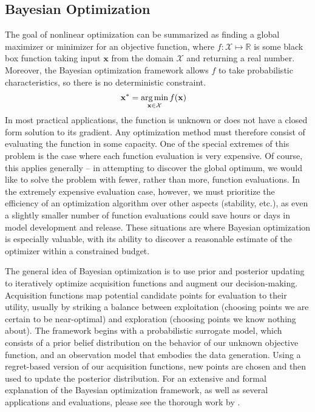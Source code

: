 \documentclass[master]{subfiles}
\begin{document}
\subsection{Bayesian Optimization} \label{sec:bo}
The goal of nonlinear optimization can be summarized as finding a global maximizer or minimizer for an objective function, where $f : \mathcal{X} \mapsto \mathbb{R}$ is some black box function taking input $\mathbf{x}$ from the domain $\mathcal{X}$ and returning a real number.  Moreover, the Bayesian optimization framework allows $f$ to take probabilistic characteristics, so there is no deterministic constraint. 
\begin{align*}
\mathbf{x}^* &= \mathop{\text{\rm arg\,min}}_{\mathbf{x} \in \mathcal{X}}f(\mathbf{x})
\end{align*}
In most practical applications, the function is unknown or does not have a closed form solution to its gradient.  Any optimization method must therefore consist of evaluating the function in some capacity.  One of the special extremes of this problem is the case where each function evaluation is very expensive.  Of course, this applies generally -- in attempting to discover the global optimum, we would like to solve the problem with fewer, rather than more, function evaluations.  In the extremely expensive evaluation case, however, we must prioritize the efficiency of an optimization algorithm over other aspects (stability, etc.), as even a slightly smaller number of function evaluations could save hours or days in model development and release.  These situations are where Bayesian optimization is especially valuable, with its ability to discover a reasonable estimate of the optimizer within a constrained budget.\par
The general idea of Bayesian optimization is to use prior and posterior updating to iteratively optimize acquisition functions and augment our decision-making.  Acquisition functions map potential candidate points for evaluation to their utility, usually by striking a balance between exploitation (choosing points we are certain to be near-optimal) and exploration (choosing points we know nothing about).  The framework begins with a probabilistic surrogate model, which consists of a prior belief distribution on the behavior of our unknown objective function, and an observation model that embodies the data generation.  Using a regret-based version of our acquisition functions, new points are chosen and then used to update the posterior distribution.  For an extensive and formal explanation of the Bayesian optimization framework, as well as several applications and evaluations, please see the thorough work by \cite{bayesopt_paper}.
\end{document}
